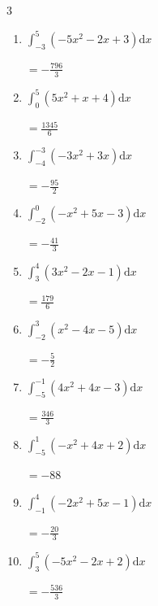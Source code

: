 \begin{multicols}{3}
\begin{enumerate}
        $\displaystyle =-\frac{770}{3}$

\columnbreak %

  \item $\displaystyle \int_{-3}^{5}\left( -5x^{2}-2x+3 \right) \mathrm{d}x$

        $\displaystyle =-\frac{796}{3}$

  \item $\displaystyle \int_{0}^{5}\left( 5x^{2}+x+4 \right) \mathrm{d}x$

        $\displaystyle =\frac{1345}{6}$

  \item $\displaystyle \int_{-4}^{-3}\left( -3x^{2}+3x \right) \mathrm{d}x$

        $\displaystyle =-\frac{95}{2}$

  \item $\displaystyle \int_{-2}^{0}\left( -x^{2}+5x-3 \right) \mathrm{d}x$

        $\displaystyle =-\frac{41}{3}$

  \item $\displaystyle \int_{3}^{4}\left( 3x^{2}-2x-1 \right) \mathrm{d}x$

        $\displaystyle =\frac{179}{6}$

\columnbreak %

\resetques

  \item $\displaystyle \int_{-2}^{3}\left( x^{2}-4x-5 \right) \mathrm{d}x$

        $\displaystyle =-\frac{5}{2}$

  \item $\displaystyle \int_{-5}^{-1}\left( 4x^{2}+4x-3 \right) \mathrm{d}x$

        $\displaystyle =\frac{346}{3}$

  \item $\displaystyle \int_{-5}^{1}\left( -x^{2}+4x+2 \right) \mathrm{d}x$

        $\displaystyle =-88$

  \item $\displaystyle \int_{-1}^{4}\left( -2x^{2}+5x-1 \right) \mathrm{d}x$

        $\displaystyle =-\frac{20}{3}$

  \item $\displaystyle \int_{3}^{5}\left( -5x^{2}-2x+2 \right) \mathrm{d}x$

        $\displaystyle =-\frac{536}{3}$


\end{enumerate}
\end{multicols}
